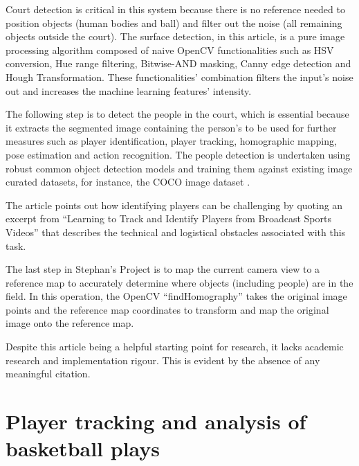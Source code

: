 \documentclass[
11pt,
twoside
]{report}
\begin{document}
Court detection is critical in this system because there is no reference needed to position objects (human bodies and ball) and filter out the noise (all remaining objects outside the court). The surface detection, in this article, is a pure image processing algorithm composed of naive OpenCV \cite{opencv} functionalities such as HSV conversion, Hue range filtering, Bitwise-AND masking, Canny edge detection and Hough Transformation. These functionalities' combination filters the input's noise out and increases the machine learning features' intensity.


The following step is to detect the people in the court, which is essential because it extracts the segmented image containing the person's to be used for further measures such as player identification, player tracking, homographic mapping, pose estimation and action recognition. The people detection is undertaken using robust common object detection models and training them against existing image curated datasets, for instance, the COCO image dataset \cite{cocodataset}.


The article points out how identifying players can be challenging by quoting an excerpt from ``Learning to Track and Identify Players from Broadcast Sports Videos'' \cite{learn_track_id} that describes the technical and logistical obstacles associated with this task.


The last step in Stephan's Project is to map the current camera view to a reference map to accurately determine where objects (including people) are in the field. In this operation, the OpenCV \cite{opencv} ``findHomography'' takes the original image points and the reference map coordinates to transform and map the original image onto the reference map.


Despite this article being a helpful starting point for research, it lacks academic research and implementation rigour. This is evident by the absence of any meaningful citation.


\section{Player tracking and analysis of basketball plays}
\end{document}
